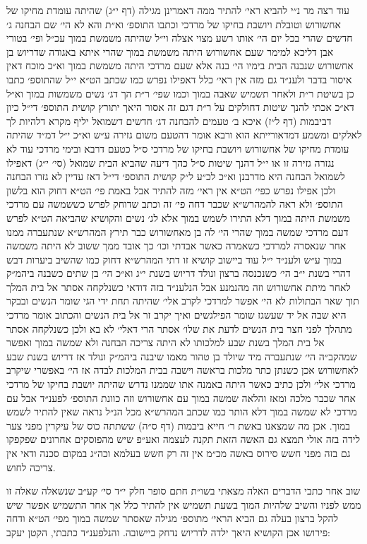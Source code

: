 \documentclass[12pt, openany]{book}
\begin{document}
\begin{multicols}{2}
עוד רצה מר נ״י להביא ראי׳ להתיר ממה דאמרינן מגילה (דף י״ג) שהיתה עומדת מחיקו של אחשורוש וטובלת ויושבת בחיקו של מרדכי וכתבו התוספ׳ וא״ת והא לא הי׳ שם הבחנה ג׳ חדשים שהרי בכל יום הי׳ אותו רשע מצוי אצלה וי״ל שהיתה משמשת במוך עכ״ל ופי׳ בטורי אבן דליכא למימר שעם אחשורוש היתה משמשת במוך שהרי איתא באגודה שדריוש בן אחשורוש שנבנה הבית בימיו הי׳ בנה אלא שעם מרדכי היתה משמשת במוך וא״כ מוכח דאין איסור בדבר ולענ״ד גם מזה אין ראי׳ כלל דאפילו נפרש כמו שכתב הט״א י״ל שהתוספ׳ כתבו כן בשיטת ר״ת ולאחר תשמיש שאבה במוך וכמו שפי׳ ר״ת הך דג׳ נשים משמשות במוך וא״ל דא״כ אכתי להנך שיטות דחולקים על ר״ת דגם זה אסור היאך יתורץ קושית התוספ׳ די״ל כיון דביבמות (דף ל״ז) איכא ב׳ טעמים להבחנה דג׳ חדשים דשמואל יליף מקרא דלהיות לך לאלקים ומשמע דמדאורייתא הוא ורבא אומר דהטעם משום גזירה ע״ש וא״כ י״ל דמ״ד שהיתה עומדת מחיקו של אחשורוש ויושבת בחיקו של מרדכי ס״ל כטעם דרבא ובימי מרדכי עוד לא נגזרה גזירה זו או י״ל דהנך שיטות ס״ל כהך דיעה שהביא הבית שמואל (סי׳ י״ג) דאפילו לשמואל הבחנה היא מדרבנן וא״כ לכ״ע ל״ק קושית התוספ׳ די״ל דאז עדיין לא גזרו הבחנה ולכן אפילו נפרש כפי׳ הט״א אין ראי׳ מזה להתיר אבל באמת פי׳ הט״א דחוק הוא בלשון התוספ׳ ולא ראה להמהרש״א שכבר דחה פי׳ זה וכתב שדוחק לפרש כששמשה עם מרדכי משמשת היתה במוך דלא התירו לשמש במוך אלא לג׳ נשים והקושיא שהביאה הט״א לפרש דעם מרדכי שמשה במוך שהרי הי׳ לה בן מאחשורוש כבר תירץ המהרש״א שנתעברה ממנו אחר שנאסרה למרדכי כשאמרה כאשר אבדתי וכו׳ כך אובד ממך ששוב לא היתה משמשה במוך ע״ש ולענ״ד י״ל עוד ביישוב קושיא זו דתי המהרש״א דחוק כמו שהשיב ביערות דבש דהרי בשנת י״ב הי׳ כשנכנסה ברצון ונולד דריוש בשנת י״ג וא״כ הי׳ בן שתים כשבנה ביהמ״ק לאחר מיתת אחשורוש וזה מהנמנע אבל הנלענ״ד בזה דודאי כשנלקחה אסתר אל בית המלך תוך שאר הבתולות לא הי׳ אפשר למרדכי לקרב אלי׳ שהיתה תחת ידי הגי שומר הנשים ובבקר היא שבה אל יד שעשגז שומר הפילגשים ואיך יקרב זר אל בית הנשים והכתוב אומר מרדכי מתהלך לפני חצר בית הנשים לדעת את שלו׳ אסתר הרי דאלי׳ לא בא ולכן כשנלקחה אסתר אל בית המלך בשנת שבע למלכותו לא היתה צריכה הבחנה ולא שמשה במוך ואפשר שמהקב״ה הי׳ שנתעברה מיד שיולד בן טהור מאמו שיבנה ביהמ״ק ונולד אז דריוש בשנת שבע לאחשורוש אכן כשנתן כתר מלכות בראשה וישבה בבית המלכות לבדה אז הי׳ באפשרי שיקרב מרדכי אלי׳ ולכן כתיב כאשר היתה באמנה אתו שממנו נדרש שהיתה יושבת בחיקו של מרדכי אחר שכבר מלכה ומאז והלאה שמשה במוך עם אחשורוש וזה כוונת התוספ׳ לפענ״ד אבל עם מרדכי לא שמשה במוך דלא הותר כמו שכתב המהרש״א מכל הנ״ל נראה שאין להתיר לשמש במוך. אכן מה שמצאנו באשת ר׳ חייא ביבמות (דף ס״ה) ששתתה כוס של עיקרין מפני צער לידה בזה אולי תמצא גם האשה הזאת תקנה לעצמה ואע״פ שיש מהפוסקים אחרונים שפקפקו גם בזה מפני חשש סירוס באשה מכ״מ אין זה רק חשש בעלמא וכה״ג במקום סכנה ודאי אין צריכה לחוש.\\\vspace{0pt}

שוב אחר כתבי הדברים האלה מצאתי בשו״ת חתם סופר חלק י״ד סי׳ קע״ב שנשאלה שאלה זו ממש לפניו והשיב שלהיות המוך בשעת תשמיש אין להתיר כלל אך אחר התשמיש אפשר שיש להקל ברצון בעלה גם הביא הראי׳ מתוספ׳ מגילה שאסתר שמשה במוך מפי׳ הט״א ודחה פירושו אכן הקושיא היאך ילדה לדריוש נדחק ביישובה. והנלפענ״ד כתבתי, הקטן יעקב:\\\vspace{0pt}

\end{multicols}\newpage
\end{document}
